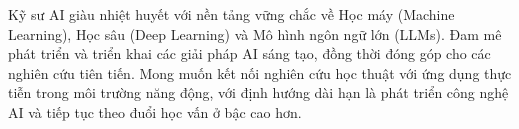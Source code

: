 

\vspace{4pt}

\begin{cvparagraph}
Kỹ sư AI giàu nhiệt huyết với nền tảng vững chắc về Học máy (Machine Learning), Học sâu (Deep Learning) và Mô hình ngôn ngữ lớn (LLMs). Đam mê phát triển và triển khai các giải pháp AI sáng tạo, đồng thời đóng góp cho các nghiên cứu tiên tiến. Mong muốn kết nối nghiên cứu học thuật với ứng dụng thực tiễn trong môi trường năng động, với định hướng dài hạn là phát triển công nghệ AI và tiếp tục theo đuổi học vấn ở bậc cao hơn.
\end{cvparagraph}

\vspace{4pt}
